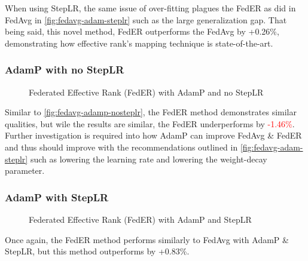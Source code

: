 When using StepLR, the same issue of over-fitting plagues the FedER as did in FedAvg in \autoref{fig:fedavg-adam-steplr} such as the large generalization gap. That being said, this novel method, FedER outperforms the FedAvg by \textcolor{ao}{+0.26\%}, demonstrating how effective rank's mapping technique is state-of-the-art. 
\newpage
\subsubsection{AdamP with no StepLR}

\begin{figure}[H]
    \centering
    \hspace{-0.80cm}
    \caption{Federated Effective Rank (FedER) with AdamP and no StepLR}
    \label{fig:feder-adamp-nosteplr}
\end{figure}

Similar to \autoref{fig:fedavg-adamp-nosteplr}, the FedER method demonstrates similar qualities, but wile the results are similar, the FedER underperforms by \textcolor{red}{-1.46\%}. Further investigation is required into how AdamP can improve FedAvg \& FedER and thus should improve with the recommendations outlined in \autoref{fig:fedavg-adam-steplr} such as lowering the learning rate and lowering the weight-decay parameter. 

\newpage
\subsubsection{AdamP with StepLR}

\begin{figure}[H]
    \centering
    \hspace{-0.80cm}
    \caption{Federated Effective Rank (FedER) with AdamP and StepLR}
    \label{fig:feder-adamp-steplr}
\end{figure}

Once again, the FedER method performs similarly to FedAvg with AdamP \& StepLR, but this method outperforms by \textcolor{ao}{+0.83\%}. 

